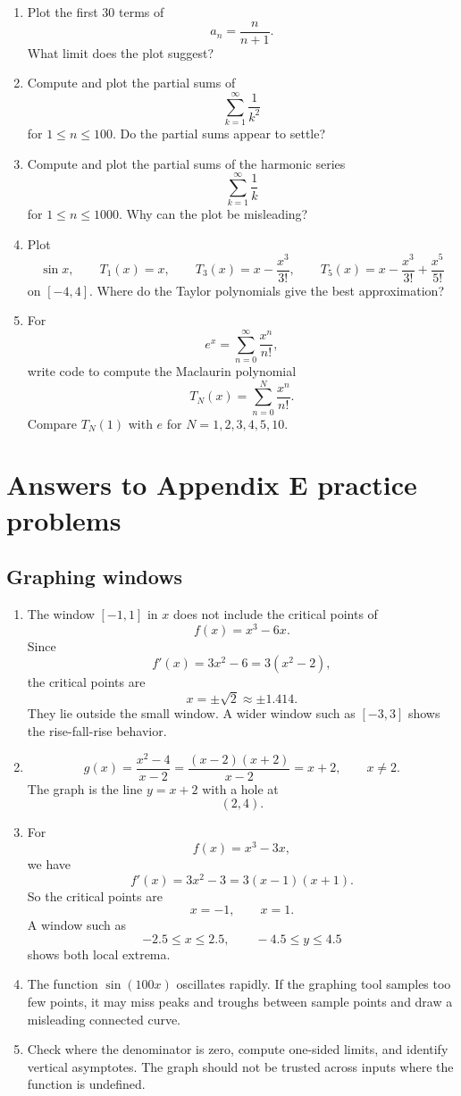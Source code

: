 \begin{enumerate}
\item Plot the first \(30\) terms of
\[
a_n=\frac{n}{n+1}.
\]
What limit does the plot suggest?

\item Compute and plot the partial sums of
\[
\sum_{k=1}^{\infty}\frac1{k^2}
\]
for \(1\le n\le100\).  Do the partial sums appear to settle?

\item Compute and plot the partial sums of the harmonic series
\[
\sum_{k=1}^{\infty}\frac1k
\]
for \(1\le n\le1000\).  Why can the plot be misleading?

\item Plot
\[
\sin x,
\qquad
T_1(x)=x,
\qquad
T_3(x)=x-\frac{x^3}{3!},
\qquad
T_5(x)=x-\frac{x^3}{3!}+\frac{x^5}{5!}
\]
on \([-4,4]\).  Where do the Taylor polynomials give the best approximation?

\item For
\[
e^x=\sum_{n=0}^{\infty}\frac{x^n}{n!},
\]
write code to compute the Maclaurin polynomial
\[
T_N(x)=\sum_{n=0}^{N}\frac{x^n}{n!}.
\]
Compare \(T_N(1)\) with \(e\) for \(N=1,2,3,4,5,10\).
\end{enumerate}

\section*{Answers to Appendix E practice problems}
\label{ans:appendix-e-practice}

\subsection*{Graphing windows}

\begin{enumerate}
\item
The window \([-1,1]\) in \(x\) does not include the critical points of
\[
f(x)=x^3-6x.
\]
Since
\[
f'(x)=3x^2-6=3(x^2-2),
\]
the critical points are
\[
x=\pm\sqrt2\approx \pm1.414.
\]
They lie outside the small window.  A wider window such as \([-3,3]\) shows the
rise-fall-rise behavior.

\item
\[
g(x)=\frac{x^2-4}{x-2}
=
\frac{(x-2)(x+2)}{x-2}
=
x+2,
\qquad x\neq2.
\]
The graph is the line \(y=x+2\) with a hole at
\[
(2,4).
\]

\item
For
\[
f(x)=x^3-3x,
\]
we have
\[
f'(x)=3x^2-3=3(x-1)(x+1).
\]
So the critical points are
\[
x=-1,\qquad x=1.
\]
A window such as
\[
-2.5\le x\le2.5,
\qquad
-4.5\le y\le4.5
\]
shows both local extrema.

\item
The function \(\sin(100x)\) oscillates rapidly.  If the graphing tool samples too few
points, it may miss peaks and troughs between sample points and draw a misleading
connected curve.

\item
Check where the denominator is zero, compute one-sided limits, and identify vertical
asymptotes.  The graph should not be trusted across inputs where the function is
undefined.
\end{enumerate}

